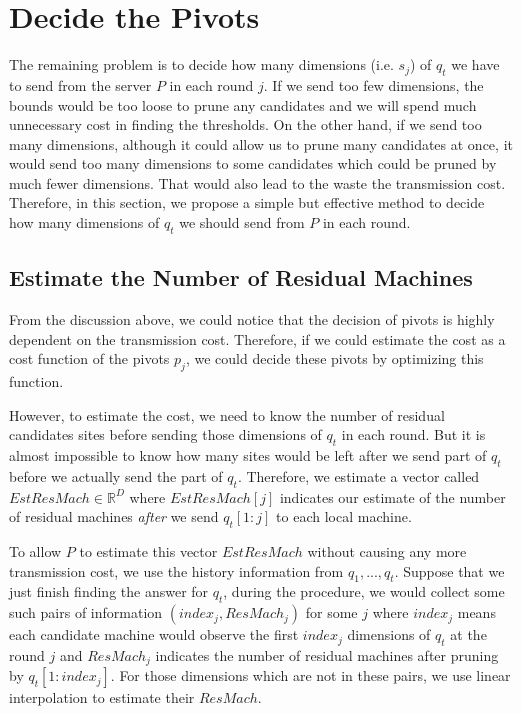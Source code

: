 \section{Decide the Pivots} %
\label{s:decide_the_pivots}

The remaining problem is to decide how many dimensions (i.e. $s_j$) of $q_t$ we have to send from the server $P$ in each round $j$.  If we send too few dimensions, the bounds would be too loose to prune any candidates and we will spend much unnecessary cost in finding the thresholds.  On the other hand, if we send too many dimensions, although it could allow us to prune many candidates at once, it would send too many dimensions to some candidates which could be pruned by much fewer dimensions.  That would also lead to the waste the transmission cost.  Therefore, in this section, we propose a simple but effective method to decide how many dimensions of $q_t$ we should send from $P$ in each round.


\subsection{Estimate the Number of Residual Machines} %
\label{ss:estimate_the_number_of_residual_machines}

From the discussion above, we could notice that the decision of pivots is highly dependent on the transmission cost.  Therefore, if we could estimate the cost as a cost function of the pivots $p_j$, we could decide these pivots by optimizing this function.

However, to estimate the cost, we need to know the number of residual candidates sites before sending those dimensions of $q_t$ in each round.  But it is almost impossible to know how many sites would be left after we send part of $q_t$ before we actually send the part of $q_t$.  Therefore, we estimate a vector called $EstResMach \in\mathbb{R}^D$ where $EstResMach[j]$ indicates our estimate of the number of residual machines \emph{after} we send $q_t[1:j]$ to each local machine.  

To allow $P$ to  estimate this vector $EstResMach$ without causing any more transmission cost, we use the history information from $q_1,...,q_t$.  Suppose that we just finish finding the answer for $q_t$, during the procedure, we would collect some such pairs of information $(index_j, ResMach_j)$ for some $j$ where $index_j$ means each candidate machine would observe the first $index_j$ dimensions of $q_t$ at the round $j$ and $ResMach_j$ indicates the number of residual machines after pruning by $q_t[1:index_j]$.  For those dimensions which are not in these pairs, we use linear interpolation to estimate their $ResMach$.  

